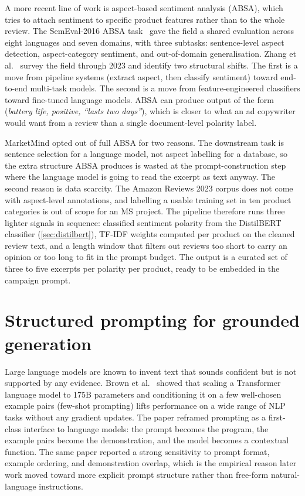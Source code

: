 \documentclass[12pt,a4paper]{report}
\begin{document}
A more recent line of work is aspect-based sentiment analysis (ABSA), which tries to attach sentiment to specific product features rather than to the whole review. The SemEval-2016 ABSA task~\cite{pontiki2016semeval} gave the field a shared evaluation across eight languages and seven domains, with three subtasks: sentence-level aspect detection, aspect-category sentiment, and out-of-domain generalisation. Zhang et al.~\cite{zhang2023absa} survey the field through 2023 and identify two structural shifts. The first is a move from pipeline systems (extract aspect, then classify sentiment) toward end-to-end multi-task models. The second is a move from feature-engineered classifiers toward fine-tuned language models. ABSA can produce output of the form (\textit{battery life, positive, ``lasts two days''}), which is closer to what an ad copywriter would want from a review than a single document-level polarity label.

MarketMind opted out of full ABSA for two reasons. The downstream task is sentence selection for a language model, not aspect labelling for a database, so the extra structure ABSA produces is wasted at the prompt-construction step where the language model is going to read the excerpt as text anyway. The second reason is data scarcity. The Amazon Reviews 2023 corpus does not come with aspect-level annotations, and labelling a usable training set in ten product categories is out of scope for an MS project. The pipeline therefore runs three lighter signals in sequence: classified sentiment polarity from the DistilBERT classifier (\cref{sec:distilbert}), TF-IDF weights computed per product on the cleaned review text, and a length window that filters out reviews too short to carry an opinion or too long to fit in the prompt budget. The output is a curated set of three to five excerpts per polarity per product, ready to be embedded in the campaign prompt.

\section{Structured prompting for grounded generation}
\label{sec:prompting}

Large language models are known to invent text that sounds confident but is not supported by any evidence. Brown et al.~\cite{brown2020gpt3} showed that scaling a Transformer language model to 175B parameters and conditioning it on a few well-chosen example pairs (few-shot prompting) lifts performance on a wide range of NLP tasks without any gradient updates. The paper reframed prompting as a first-class interface to language models: the prompt becomes the program, the example pairs become the demonstration, and the model becomes a contextual function. The same paper reported a strong sensitivity to prompt format, example ordering, and demonstration overlap, which is the empirical reason later work moved toward more explicit prompt structure rather than free-form natural-language instructions.
\end{document}
